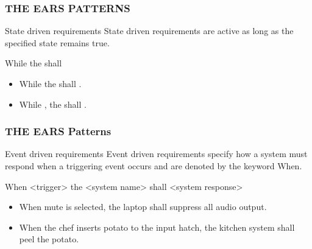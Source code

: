 \documentclass[aspectratio=169]{beamer}
\begin{document}
\begin{frame}[fragile]
  \frametitle{THE EARS PATTERNS}
  \begin{block}{State driven requirements}
  State driven requirements are active as long as the specified state remains true.
    \begin{center}
      While {\color{orange}{$<$pre-condition(s)$>$}} the {\color{red}{$<$system name$>$}} shall {\color{blue}{$<$system response$>$}}
    \end{center}  
  \end{block}
  
  \begin{example}
  \begin{itemize}
    \item While {\color{orange}{there is no card in the ATM}} the {\color{red}{ATM}} shall {\color{blue}{display "insert card to begin"}}.
    \item While {\color{orange}{in maintenance mode}}, the {\color{red}{kitchen system}} shall {\color{blue}{reject all input}}.
  \end{itemize}
  \end{example}

\end{frame}

\begin{frame}[fragile]
  \frametitle{THE EARS Patterns}
  \begin{block}{Event driven requirements}
  Event driven requirements specify how a system must respond when a triggering event occurs and are denoted by the keyword When.
    \begin{center}
      When <trigger> the <system name> shall <system response>
    \end{center}
  \end{block}
  
  \begin{example}
  \begin{itemize}
    \item When mute is selected, the laptop shall suppress all audio output.
    \item When the chef inserts potato to the input hatch, the kitchen system shall peel the potato.
  \end{itemize}
  \end{example}
\end{frame}
\end{document}
